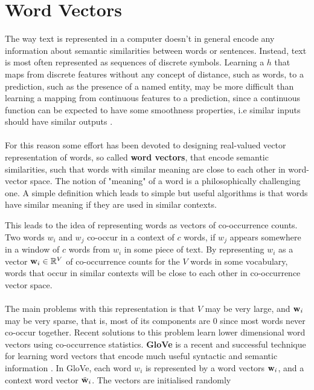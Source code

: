 \section{Word Vectors}
The way text is represented in a computer doesn't in general encode any information about semantic similarities between words or sentences. Instead, text is most often represented as sequences of discrete symbols. Learning a $h$ that maps from discrete features without any concept of distance, such as words, to a prediction, such as the presence of a named entity, may be more difficult than learning a mapping from continuous features to a prediction, since a continuous function can be expected to have some smoothness properties, i.e similar inputs should have similar outputs \citep{bengio2003}.
\\\\
For this reason some effort has been devoted to designing real-valued vector representation of words, so called \textbf{word vectors}, that encode semantic similarities, such that words with similar meaning are close to each other in word-vector space. The notion of "meaning" of a word is a philosophically challenging one. A simple definition which leads to simple but useful algorithms is that words have similar meaning if they are used in similar contexts.

This leads to the idea of representing words as vectors of co-occurrence counts. Two words $w_i$ and $w_j$ co-occur in a context of $c$ words, if $w_j$ appears somewhere in a window of $c$ words from $w_i$ in some piece of text. By representing $w_i$ as a vector $\mathbf{w}_i \in \mathbb{R}^V$ of co-occurrence counts for the $V$ words in some vocabulary, words that occur in similar contexts will be close to each other in co-occurrence vector space.
\\\\
The main problems with this representation is that $V$ may be very large, and $\mathbf{w}_i$ may be very sparse, that is, most of its components are 0 since most words never co-occur together. Recent solutions to this problem learn lower dimensional word vectors using co-occurrence statistics. \textbf{GloVe} is a recent and successful technique for learning word vectors that encode much useful syntactic and semantic information \citep{pennington2014}. In GloVe, each word $w_i$ is represented by a word vectors $\mathbf{w}_i$, and a context word vector $\tilde{\mathbf{w}}_i$. The vectors are initialised randomly

